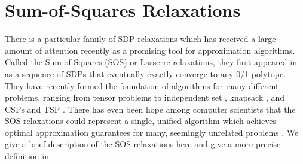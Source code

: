 
\section{Sum-of-Squares Relaxations}
There is a particular family of SDP relaxations which has received a large amount of attention recently as a promising tool for approximation algorithms. Called the Sum-of-Squares (SOS) or Lasserre relaxations, they first appeared in \cite{Parr00,Las01} as a sequence of SDPs that eventually exactly converge to any 0/1 polytope. They have recently formed the foundation of algorithms for many different problems, ranging from tensor problems \cite{TS15,BKS15,HSS15,PS17} to independent set \cite{CS08}, knapsack \cite{KMN10}, and \textsc{CSP}s and \textsc{TSP} \cite{RT12,LRST14}. There has even been hope among computer scientists that the SOS relaxations could represent a single, unified algorithm which achieves optimal approximation guarantees for many, seemingly unrelated problems \cite{BS14}. We give a brief description of the SOS relaxations here and give a more precise definition in .

